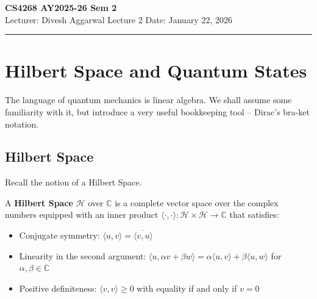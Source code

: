 


% 


\newpage
\noindent
\textbf{CS4268 AY2025-26 Sem 2}
\\
\noindent
Lecturer: Divesh Aggarwal
\hfill
Lecture 2                      %
\hfill
Date: January 22, 2026          %


\noindent
\rule{\textwidth}{1pt}

\medskip

\section{Hilbert Space and Quantum States}
The language of quantum mechanics is linear algebra. We shall assume some familiarity with it, but introduce a very useful bookkeeping tool -- Dirac's bra-ket notation.

\subsection{Hilbert Space}

Recall the notion of a Hilbert Space.
\begin{definition}
A \textbf{Hilbert Space} $\mathcal{H}$ over $\mathbb{C}$ is a complete vector space over the complex numbers equipped with an inner product $\langle \cdot, \cdot \rangle : \mathcal{H} \times \mathcal{H} \to \mathbb{C}$ that satisfies:
\begin{itemize}
\item Conjugate symmetry: $\langle u, v \rangle = \overline{\langle v, u \rangle}$
\item Linearity in the second argument: $\langle u, \alpha v + \beta w \rangle = \alpha \langle u, v \rangle + \beta \langle u, w \rangle$ for $\alpha, \beta \in \mathbb{C}$
\item Positive definiteness: $\langle v, v \rangle \geq 0$ with equality if and only if $v = 0$
\end{itemize}
\end{definition}

